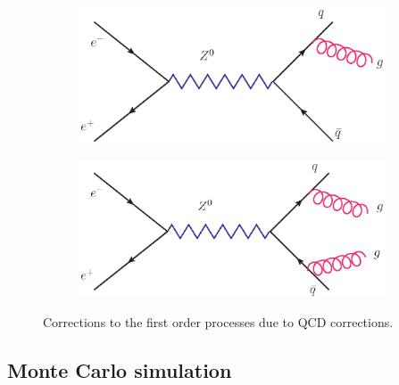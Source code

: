 \begin{figure}[htpb]
\centering
\begin{subfigure}{.5\textwidth}
  \centering
  \includegraphics[width=1.0\linewidth]{figures/QCD1}
  \label{fig:sub1}
\end{subfigure}%
\begin{subfigure}{.5\textwidth}
  \centering
  \includegraphics[width=1.0\linewidth]{figures/QCD2}
  \label{fig:sub2}
\end{subfigure}
\caption{Corrections to the first order processes due to QCD corrections.}
\label{fig:QCD_corr}
\end{figure}

\clearpage
\subsection{Monte Carlo simulation}
\label{sub:monte_carlo_simulation}


